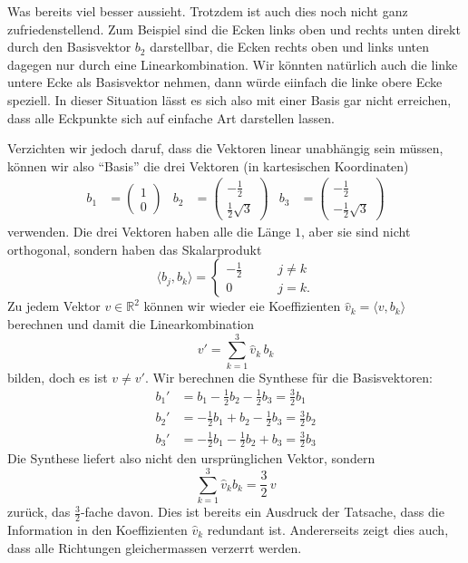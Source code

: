 Was bereits viel besser aussieht.
Trotzdem ist auch dies noch nicht ganz zufriedenstellend. 
Zum Beispiel sind die Ecken links oben und rechts unten direkt durch den
Basisvektor $b_2$ darstellbar, die Ecken rechts oben und links unten
dagegen nur durch eine Linearkombination.
Wir könnten natürlich auch die linke untere Ecke als Basisvektor nehmen,
dann würde eiinfach die linke obere Ecke speziell.
In dieser Situation lässt es sich also mit einer Basis gar nicht erreichen,
dass alle Eckpunkte sich auf einfache Art darstellen lassen.

Verzichten wir jedoch daruf, dass die Vektoren linear unabhängig sein müssen,
können wir also ``Basis'' die drei Vektoren (in kartesischen Koordinaten)
\begin{align*}
b_1
&=
\begin{pmatrix}1\\0\end{pmatrix}
&
b_2
&=
\begin{pmatrix}-\frac12\\\frac12\sqrt{3}\end{pmatrix}
&
b_3
&=
\begin{pmatrix}-\frac12\\-\frac12\sqrt{3}\end{pmatrix}
\end{align*}
verwenden.
Die drei Vektoren haben alle die Länge $1$, aber sie sind nicht
orthogonal, sondern haben das Skalarprodukt
\[
\langle b_j,b_k\rangle
=
\begin{cases}
-\frac12&\qquad j\ne k\\
0&\qquad j=k.
\end{cases}
\]
Zu jedem Vektor $v\in\mathbb R^2$ können wir wieder eie Koeffizienten
$\hat{v}_k=\langle v,b_k\rangle$ berechnen und damit die Linearkombination
\[
v' = \sum_{k=1}^3 \hat{v}_k\,b_k
\]
bilden,
doch es ist $v\ne v'$.
Wir berechnen die Synthese für die Basisvektoren:
\begin{align*}
b_1'
&=
b_1 - \frac12 b_2 - \frac 12 b_3
=
\frac32b_1
\\
b_2'
&=
-\frac12 b_1 + b_2 -\frac12 b_3
=
\frac32b_2
\\
b_3'
&=
-\frac12b_1-\frac12 b_2 + b_3
=
\frac32b_3
\end{align*}
Die Synthese liefert also nicht den ursprünglichen Vektor, sondern
\begin{equation}
\sum_{k=1}^3 \hat{v}_k b_k = \frac32\,v
\label{geometrie:32beispiel}
\end{equation}
zurück, das $\frac32$-fache davon.
Dies ist bereits ein Ausdruck der Tatsache, dass die Information in den
Koeffizienten $\hat{v}_k$ redundant ist.
Andererseits zeigt dies auch, dass alle Richtungen gleichermassen
verzerrt werden.

